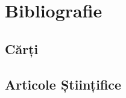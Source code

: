 \documentclass[../../main.tex]{subfiles}
\begin{document}
\chapter*{Bibliografie}
\label{ch:bibliography}


\section*{Cărți}
\label{sec:bibliography_books}
\nocite{*}

\printbibliography[type=book,heading=none]

\section*{Articole Științifice}
\label{sec:bibliography_papers}
\nocite{*}

\printbibliography[type=article,heading=none]
\end{document}

